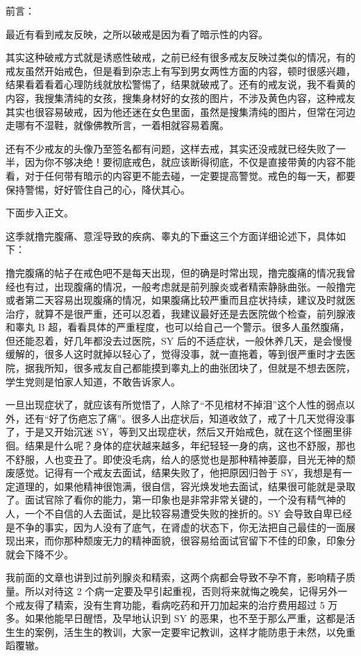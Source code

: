 \documentclass{ctexart}
\begin{document}
前言：

最近有看到戒友反映，之所以破戒是因为看了暗示性的内容。

其实这种破戒方式就是诱惑性破戒，之前已经有很多戒友反映过类似的情况，有的戒友虽然开始戒色，但是看到杂志上有写到男女两性方面的内容，顿时很感兴趣，结果看着看着心理防线就放松警惕了，结果就破戒了。还有的戒友说，我不看黄的内容，我搜集清纯的女孩，搜集身材好的女孩的图片，不涉及黄色内容，这种戒友其实也很容易破戒，因为他还迷在女色里面，虽然是搜集清纯的图片，但常在河边走哪有不湿鞋，就像佛教所言，一着相就容易着魔。

还有不少戒友的头像乃至签名都有问题，这样去戒，其实还没戒就已经失败了一半，因为你不够决绝！要彻底戒色，就应该断得彻底，不仅是直接带黄的内容不能看，对于任何带有暗示的内容更不能去碰，一定要提高警觉。戒色的每一天，都要保持警惕，好好管住自己的心，降伏其心。

下面步入正文。

这季就撸完腹痛、意淫导致的疾病、睾丸的下垂这三个方面详细论述下，具体如下：

撸完腹痛的帖子在戒色吧不是每天出现，但的确是时常出现，撸完腹痛的情况我曾经也有过，出现腹痛的情况，一般考虑就是前列腺炎或者精索静脉曲张。一般撸完或者第二天容易出现腹痛的情况，如果腹痛比较严重而且症状持续，建议及时就医治疗，就算不是很严重，还可以忍着，我建议最好还是去医院做个检查，前列腺液和睾丸 B 超，看看具体的严重程度，也可以给自己一个警示。很多人虽然腹痛，但还能忍着，好几年都没去过医院，SY 后的不适症状，一般休养几天，是会慢慢缓解的，很多人这时就掉以轻心了，觉得没事，就一直拖着，等到很严重时才去医院，据我所知，很多戒友自己都能摸到睾丸上的曲张团块了，但就是不想去医院，学生党则是怕家人知道，不敢告诉家人。

一旦出现症状了，就应该有所觉悟了，人除了“不见棺材不掉泪”这个人性的弱点以外，还有“好了伤疤忘了痛”。很多人出症状后，知道收敛了，戒了十几天觉得没事了，于是又开始沉迷 SY，等到又出现症状，然后又开始戒色，就在这个怪圈里徘徊。结果是什么呢？身体的症状越来越多，年纪轻轻一身的病，这也不舒服，那也不舒服，人也变丑了。即使没毛病，给人的感觉也是那种精神萎靡，目光无神的颓废感觉。记得有一个戒友去面试，结果失败了，他把原因归咎于 SY，我想是有一定道理的，如果他精神很饱满，很自信，容光焕发地去面试，结果很可能就是录取了。面试官除了看你的能力，第一印象也是非常非常关键的，一个没有精气神的人，一个不自信的人去面试，是比较容易遭受失败的挫折的。SY 会导致自卑已经是不争的事实，因为人没有了底气，在肾虚的状态下，你无法把自己最佳的一面展现出来，而你那种颓废无力的精神面貌，很容易给面试官留下不佳的印象，印象分就会下降不少。

我前面的文章也讲到过前列腺炎和精索，这两个病都会导致不孕不育，影响精子质量。所以对待这 2 个病一定要及早引起重视，否则将来就悔之晚矣，记得另外一个戒友得了精索，没有生育功能，看病吃药和开刀加起来的治疗费用超过 5 万多。如果他能早日醒悟，及早地认识到 SY 的恶果，也不至于那么严重，这都是活生生的案例，活生生的教训，大家一定要牢记教训，这样才能防患于未然，以免重蹈覆辙。
\end{document}
